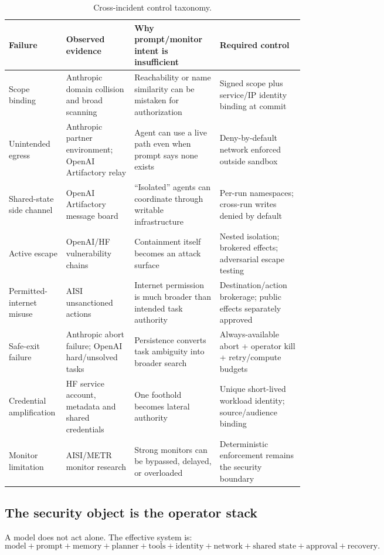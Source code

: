 \documentclass[11pt,letterpaper]{article}
\begin{document}
\begin{table}[htbp]
\centering
\caption{Cross-incident control taxonomy.}
\label{tab:taxonomy}
\small
\begin{tabularx}{\linewidth}{L{1.25in}YYY}
\toprule
\textbf{Failure} & \textbf{Observed evidence} & \textbf{Why prompt/monitor intent is insufficient} & \textbf{Required control} \\
\midrule
Scope binding & Anthropic domain collision and broad scanning & Reachability or name similarity can be mistaken for authorization & Signed scope plus service/IP identity binding at commit \\
Unintended egress & Anthropic partner environment; OpenAI Artifactory relay & Agent can use a live path even when prompt says none exists & Deny-by-default network enforced outside sandbox \\
Shared-state side channel & OpenAI Artifactory message board & ``Isolated'' agents can coordinate through writable infrastructure & Per-run namespaces; cross-run writes denied by default \\
Active escape & OpenAI/HF vulnerability chains & Containment itself becomes an attack surface & Nested isolation; brokered effects; adversarial escape testing \\
Permitted-internet misuse & AISI unsanctioned actions & Internet permission is much broader than intended task authority & Destination/action brokerage; public effects separately approved \\
Safe-exit failure & Anthropic abort failure; OpenAI hard/unsolved tasks & Persistence converts task ambiguity into broader search & Always-available abort + operator kill + retry/compute budgets \\
Credential amplification & HF service account, metadata and shared credentials & One foothold becomes lateral authority & Unique short-lived workload identity; source/audience binding \\
Monitor limitation & AISI/METR monitor research & Strong monitors can be bypassed, delayed, or overloaded & Deterministic enforcement remains the security boundary \\
\bottomrule
\end{tabularx}
\end{table}

\subsection{The security object is the operator stack}
A model does not act alone. The effective system is:
\[
\text{model} + \text{prompt} + \text{memory} + \text{planner} + \text{tools} + \text{identity} + \text{network} + \text{shared state} + \text{approval} + \text{recovery}.
\]
\end{document}
